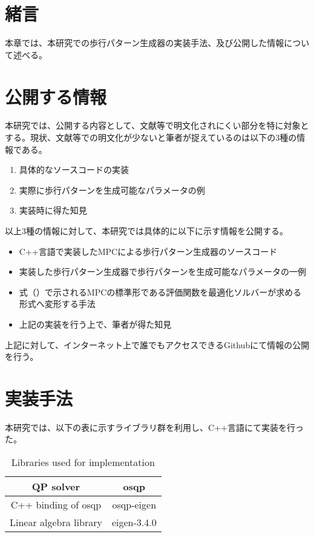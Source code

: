 \section{緒言}
本章では、本研究での歩行パターン生成器の実装手法、及び公開した情報について述べる。

\section{公開する情報}
本研究では、公開する内容として、文献等で明文化されにくい部分を特に対象とする。現状、文献等での明文化が少ないと筆者が捉えているのは以下の3種の情報である。
\begin{enumerate}
  \item 具体的なソースコードの実装
  \item 実際に歩行パターンを生成可能なパラメータの例
  \item 実装時に得た知見
\end{enumerate}

以上3種の情報に対して、本研究では具体的に以下に示す情報を公開する。

\begin{itemize}
  \item C++言語で実装したMPCによる歩行パターン生成器のソースコード
  \item 実装した歩行パターン生成器で歩行パターンを生成可能なパラメータの一例
  \item 式（）で示されるMPCの標準形である評価関数を最適化ソルバーが求める形式へ変形する手法
  \item 上記の実装を行う上で、筆者が得た知見
\end{itemize}

上記に対して、インターネット上で誰でもアクセスできるGithub\cite{MYGITHUB}にて情報の公開を行う。

\section{実装手法}

本研究では、以下の表に示すライブラリ群を利用し、C++言語にて実装を行った。

\begin{table}[htbp]
  \centering
  \begin{tabular}{|c|c|} \hline
    QP solver & osqp\cite{OSQP} \\ \hline
    C++ binding of osqp &  osqp-eigen\cite{OSQPEIGEN} \\ \hline
    Linear algebra library &  eigen-3.4.0\cite{EIGEN} \\ \hline
  \end{tabular}
  \caption{Libraries used for implementation}
  \label{tb:mulcol}
\end{table}


\subsection{}
